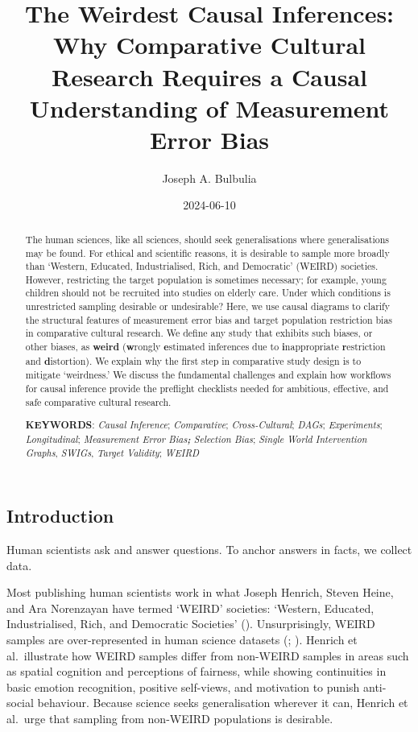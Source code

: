 \documentclass[
  single column]{article}
\title{The Weirdest Causal Inferences: Why Comparative Cultural Research
Requires a Causal Understanding of Measurement Error Bias}
\author{Joseph A. Bulbulia}
\affil{%
             \small{     Victoria University of Wellington, New Zealand
          ORCID \textcolor[HTML]{A6CE39}{\aiOrcid} ~0000-0002-5861-2056 }
              }
\date{2024-06-10}
\begin{document}
\maketitle
\begin{abstract}
The human sciences, like all sciences, should seek generalisations where
generalisations may be found. For ethical and scientific reasons, it is
desirable to sample more broadly than `Western, Educated,
Industrialised, Rich, and Democratic' (WEIRD) societies. However,
restricting the target population is sometimes necessary; for example,
young children should not be recruited into studies on elderly care.
Under which conditions is unrestricted sampling desirable or
undesirable? Here, we use causal diagrams to clarify the structural
features of measurement error bias and target population restriction
bias in comparative cultural research. We define any study that exhibits
such biases, or other biases, as \textbf{weird} (\textbf{w}rongly
\textbf{e}stimated inferences due to \textbf{i}nappropriate
\textbf{r}estriction and \textbf{d}istortion). We explain why the first
step in comparative study design is to mitigate `weirdness.' We discuss
the fundamental challenges and explain how workflows for causal
inference provide the preflight checklists needed for ambitious,
effective, and safe comparative cultural research.

\textbf{KEYWORDS}: \emph{Causal Inference}; \emph{Comparative};
\emph{Cross-Cultural}; \emph{DAGs}; \emph{Experiments};
\emph{Longitudinal}; \emph{Measurement Error Bias\textbf{; }Selection
Bias}; \emph{Single World Intervention Graphs}, \emph{SWIGs},
\emph{Target Validity}; \emph{WEIRD}
\end{abstract}

\subsection{Introduction}\label{id-sec-intro}

Human scientists ask and answer questions. To anchor answers in facts,
we collect data.

Most publishing human scientists work in what Joseph Henrich, Steven
Heine, and Ara Norenzayan have termed `WEIRD' societies: `Western,
Educated, Industrialised, Rich, and Democratic Societies'
().
Unsurprisingly, WEIRD samples are over-represented in human science
datasets (;
). Henrich et al.~illustrate
how WEIRD samples differ from non-WEIRD samples in areas such as spatial
cognition and perceptions of fairness, while showing continuities in
basic emotion recognition, positive self-views, and motivation to punish
anti-social behaviour. Because science seeks generalisation wherever it
can, Henrich et al.~urge that sampling from non-WEIRD populations is
desirable.
\end{document}

